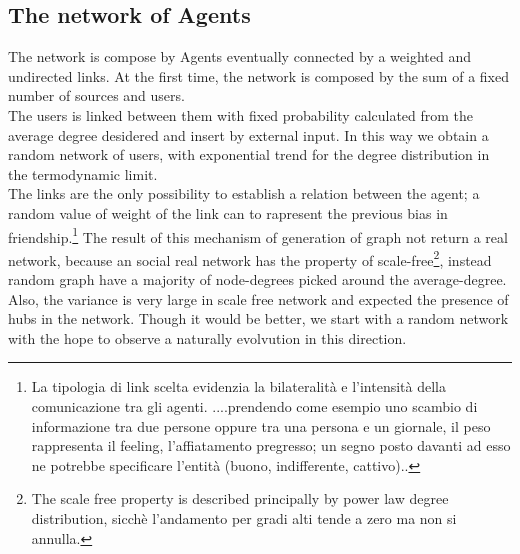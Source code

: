 \documentclass[11pt]{article} %
\begin{document}
\subsection{The network of Agents}
The network is compose by Agents eventually connected by a weighted and undirected links.
At the first time, the network is composed by the sum of a fixed number of sources and users. \\The users is linked between them with fixed probability calculated from the average degree desidered and insert by external input. In this way we obtain a random network of users, with exponential trend for the degree distribution in the termodynamic limit.\\ The links are the only possibility to establish a relation between the agent; a random value of weight of the link can to rapresent the previous bias in friendship.\footnote{La tipologia di link scelta evidenzia la bilateralità e l’intensità della comunicazione tra gli agenti.   ....prendendo come esempio uno scambio di informazione tra due persone oppure tra una persona e un giornale, il peso rappresenta il feeling, l’affiatamento pregresso; un segno posto davanti ad esso ne potrebbe specificare l’entità (buono, indifferente, cattivo)..}
 The result of this mechanism of generation of graph not return a real network, because an social real network has the property of scale-free\footnote{The scale free property is described principally by power law degree distribution, sicchè l'andamento per gradi alti tende a zero ma non si annulla. },
 instead random graph have a majority of node-degrees picked around the average-degree. Also, the variance is very large in scale free network and expected the presence of hubs in the network. Though it would be better, we start with a random network with the hope to observe a naturally evolvution in this direction.
\\
\end{document}
